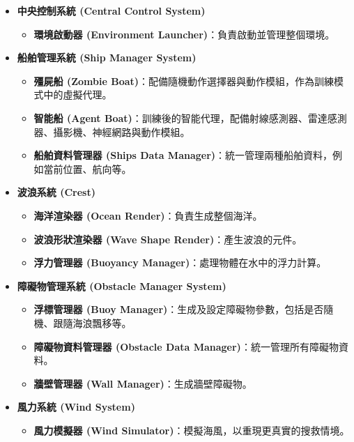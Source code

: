 \documentclass[12pt,a4paper]{article}
\begin{document}
\begin{itemize}
	 \item \textbf{中央控制系統 (Central Control System)}
	\begin{itemize}
	    \item \textbf{環境啟動器 (Environment Launcher)}：負責啟動並管理整個環境。
	\end{itemize}
	
	 \item \textbf{船舶管理系統 (Ship Manager System)}
	\begin{itemize}
	    \item \textbf{殭屍船 (Zombie Boat)}：配備隨機動作選擇器與動作模組，作為訓練模式中的虛擬代理。
	    \item \textbf{智能船 (Agent Boat)}：訓練後的智能代理，配備射線感測器、雷達感測器、攝影機、神經網路與動作模組。
	    \item \textbf{船舶資料管理器 (Ships Data Manager)}：統一管理兩種船舶資料，例如當前位置、航向等。
	\end{itemize}
	
	 \item \textbf{波浪系統 (Crest)}
	\begin{itemize}
	    \item \textbf{海洋渲染器 (Ocean Render)}：負責生成整個海洋。
	    \item \textbf{波浪形狀渲染器 (Wave Shape Render)}：產生波浪的元件。
	    \item \textbf{浮力管理器 (Buoyancy Manager)}：處理物體在水中的浮力計算。
	\end{itemize}
	
	 \item \textbf{障礙物管理系統 (Obstacle Manager System)}
	\begin{itemize}
	    \item \textbf{浮標管理器 (Buoy Manager)}：生成及設定障礙物參數，包括是否隨機、跟隨海浪飄移等。
	    \item \textbf{障礙物資料管理器 (Obstacle Data Manager)}：統一管理所有障礙物資料。
	    \item \textbf{牆壁管理器 (Wall Manager)}：生成牆壁障礙物。
	\end{itemize}
	
	 \item \textbf{風力系統 (Wind System)}
	\begin{itemize}
	    \item \textbf{風力模擬器 (Wind Simulator)}：模擬海風，以重現更真實的搜救情境。
	\end{itemize}
	

\end{itemize}
\end{document}
